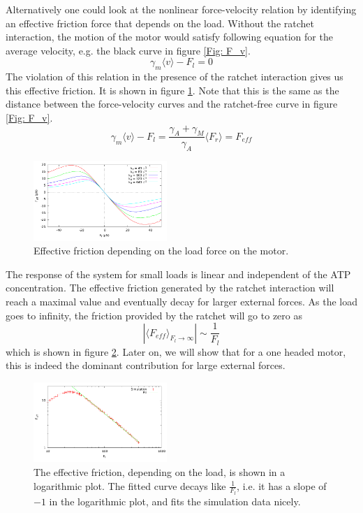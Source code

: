 \documentclass[aps,pre,twocolumn,showpacs,showkeys,a4paper]{revtex4}
\begin{document}
Alternatively one could look at the nonlinear force-velocity relation by identifying an effective friction force that depends on the load. 
Without the ratchet interaction, the motion of the motor would satisfy following equation for the average velocity, e.g. the black curve in figure \ref{Fig: F_v}.
\begin{equation*}
\gamma_{m}\langle v\rangle - F_{l} = 0
\end{equation*}
The violation of this relation in the presence of the ratchet interaction gives us this effective friction. 
It is shown in figure \ref{Fig: effective_friction}. 
Note that this is the same as the distance between the force-velocity curves and the ratchet-free curve in figure \ref{Fig: F_v}.
\begin{equation*}
\gamma_{m} \langle v \rangle - F_{l} = \frac{\gamma_A + \gamma_M}{\gamma_A} \langle F_r \rangle = F_{eff}
\end{equation*}
\begin{figure}[t]
\centering
\includegraphics[width=0.45\textwidth,height=!]{effective_friction}
\caption{Effective friction depending on the load force on the motor.}
\label{Fig: effective_friction}
\end{figure}
The response of the system for small loads is linear and independent of the ATP concentration. 
The effective friction generated by the ratchet interaction will reach a maximal value and eventually decay for larger external forces. 
As the load goes to infinity, the friction provided by the ratchet will go to zero as 
\begin{equation*}
\left| \langle F_{eff} \rangle_{F_l\rightarrow\infty} \right| \sim \frac{1}{F_l}
\end{equation*} 
which is shown in figure \ref{Fig: eff_frict_decay}. 
Later on, we will show that for a one headed motor, this is indeed the dominant contribution for large external forces.  
\begin{figure}[b]
\centering
\includegraphics[width=0.45\textwidth,height=!]{eff_frict_decay}
\caption{The effective friction, depending on the load, is shown in a logarithmic plot. 
The fitted curve decays like $\frac{1}{F_l}$, i.e. it has a slope of $-1$ in the logarithmic plot, and fits the simulation data nicely.}
\label{Fig: eff_frict_decay}
\end{figure}
\end{document}
